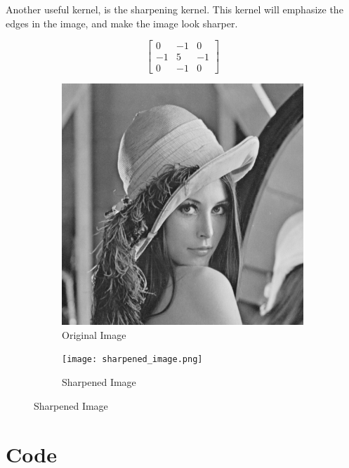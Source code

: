 \documentclass[12pt]{report}
\begin{document}
Another useful kernel, is the sharpening kernel. This kernel will emphasize the edges in the image, and make the image look sharper.

\begin{equation*}
    \begin{bmatrix}
        0  & -1 & 0  \\
        -1 & 5  & -1 \\
        0  & -1 & 0
    \end{bmatrix}
\end{equation*}

\begin{figure}[H]
    \centering
    \begin{subfigure}{0.4\textwidth}
        \centering
        \includegraphics[width=\linewidth]{Lena.png}
        \caption{Original Image}
    \end{subfigure}
    \begin{subfigure}{0.4\textwidth}
        \centering
        \texttt{[image: sharpened\_image.png]}
        \caption{Sharpened Image}
    \end{subfigure}
\end{figure}

\section{Code}
\end{document}
